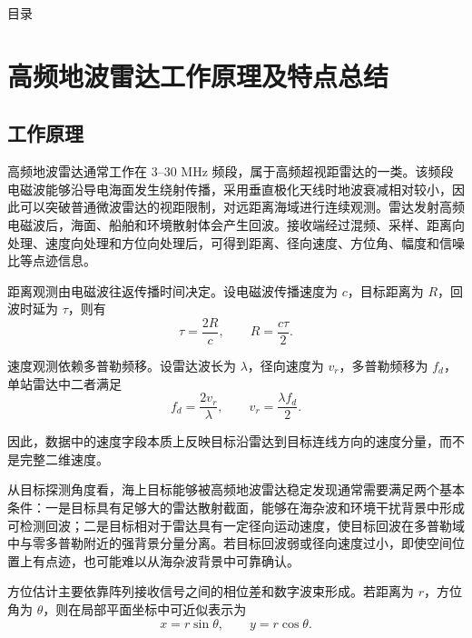 \documentclass[UTF8,a4paper,12pt]{ctexart}
\makeatletter
\newcommand{\printtocentries}{\@starttoc{toc}}
\numberwithin{figure}{section}
\numberwithin{table}{section}
\makeatother
\begin{document}
\thispagestyle{plain}
{\onehalfspacing
\begin{center}
  {\heiti{}目\quad 录}
\end{center}
\vspace{0.4em}
{\songti{}\printtocentries}
}

\newpage
{}
\setcounter{page}{1}

\section{高频地波雷达工作原理及特点总结}

\subsection{工作原理}

高频地波雷达通常工作在 3--30 MHz 频段，属于高频超视距雷达的一类。该频段电磁波能够沿导电海面发生绕射传播，采用垂直极化天线时地波衰减相对较小，因此可以突破普通微波雷达的视距限制，对远距离海域进行连续观测。雷达发射高频电磁波后，海面、船舶和环境散射体会产生回波。接收端经过混频、采样、距离向处理、速度向处理和方位向处理后，可得到距离、径向速度、方位角、幅度和信噪比等点迹信息。

距离观测由电磁波往返传播时间决定。设电磁波传播速度为 \(c\)，目标距离为 \(R\)，回波时延为 \(\tau\)，则有
\begin{equation}
  \tau = \frac{2R}{c},
  \qquad
  R = \frac{c\tau}{2}.
  \label{eq:range}
\end{equation}

速度观测依赖多普勒频移。设雷达波长为 \(\lambda\)，径向速度为 \(v_r\)，多普勒频移为 \(f_d\)，单站雷达中二者满足
\begin{equation}
  f_d = \frac{2v_r}{\lambda},
  \qquad
  v_r = \frac{\lambda f_d}{2}.
  \label{eq:doppler}
\end{equation}

因此，数据中的速度字段本质上反映目标沿雷达到目标连线方向的速度分量，而不是完整二维速度。

从目标探测角度看，海上目标能够被高频地波雷达稳定发现通常需要满足两个基本条件：一是目标具有足够大的雷达散射截面，能够在海杂波和环境干扰背景中形成可检测回波；二是目标相对于雷达具有一定径向运动速度，使目标回波在多普勒域中与零多普勒附近的强背景分量分离。若目标回波弱或径向速度过小，即使空间位置上有点迹，也可能难以从海杂波背景中可靠确认。

方位估计主要依靠阵列接收信号之间的相位差和数字波束形成。若距离为 \(r\)，方位角为 \(\theta\)，则在局部平面坐标中可近似表示为
\begin{equation}
  x = r\sin\theta,\qquad y = r\cos\theta.
  \label{eq:xy}
\end{equation}
\end{document}
